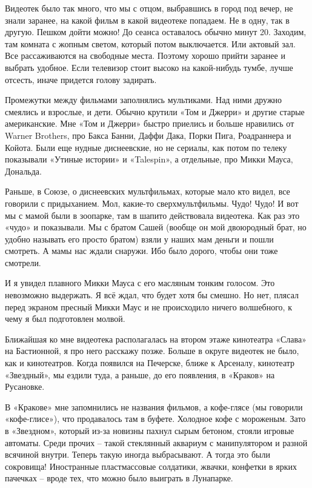 Видеотек было так много, что мы с отцом, выбравшись в город под вечер, не знали заранее, на какой фильм в какой видеотеке попадаем. Не в одну, так в другую. Пешком дойти можно! До сеанса оставалось обычно минут 20. Заходим, там комната с жопным светом, который потом выключается. Или актовый зал. Все рассаживаются на свободные места. Поэтому хорошо прийти заранее и выбрать удобное. Если телевизор стоит высоко на какой-нибудь тумбе, лучше отсесть, иначе придется голову задирать.

Промежутки между фильмами заполнялись мультиками. Над ними дружно смеялись и взрослые, и дети. Обычно крутили «Том и Джерри» и другие старые американские. Мне «Том и Джерри» быстро приелись и больше нравились от Warner Brothers, про Бакса Банни, Даффи Дака, Порки Пига, Роадраннера и Койота. Были еще нудные диснеевские, но не сериалы, как потом по телеку показывали «Утиные истории» и «Talespin», а отдельные, про Микки Мауса, Дональда.

Раньше, в Союзе, о диснеевских мультфильмах, которые мало кто видел, все говорили с придыханием. Мол, какие-то сверхмультфильмы. Чудо! Чудо! И вот мы с мамой были в зоопарке, там в шапито действовала видеотека. Как раз это «чудо» и показывали. Мы с братом Сашей (вообще он мой двоюродный брат, но удобно называть его просто братом) взяли у наших мам деньги и пошли смотреть. А мамы нас ждали снаружи. Ибо было дорого, чтобы они тоже смотрели.

И я увидел плавного Микки Мауса с его масляным тонким голосом. Это невозможно выдержать. Я всё ждал, что будет хотя бы смешно. Но нет, плясал перед экраном пресный Микки Маус и не происходило ничего волшебного, к чему я был подготовлен молвой.

Ближайшая ко мне видеотека располагалась на втором этаже кинотеатра «Слава» на Бастионной, я про него расскажу позже. Больше в округе видеотек не было, как и кинотеатров. Когда появился на Печерске, ближе к Арсеналу, кинотеатр «Звездный», мы ездили туда, а раньше, до его появления, в «Краков» на Русановке. 

В «Кракове» мне запомнились не названия фильмов, а кофе-глясе (мы говорили «кофе-глисе»), что продавалось там в буфете. Холодное кофе с мороженым. Зато в «Звездном», который из-за новизны пахнул сырым бетоном, стояли игровые автоматы. Среди прочих – такой стеклянный аквариум с манипулятором и разной всячиной внутри. Теперь такую иногда выбрасывают. А тогда это были сокровища! Иностранные пластмассовые солдатики, жвачки, конфетки в ярких пачечках – вроде тех, что можно было выиграть в Лунапарке.

